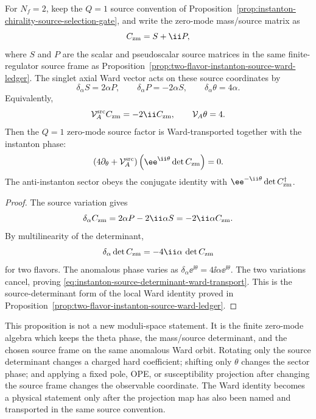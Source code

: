 \begin{proposition}
\label{prop:instanton-axial-ward-source-transport}
For \(N_f=2\), keep the \(Q=1\) source convention of
Proposition~\ref{prop:instanton-chirality-source-selection-gate}, and write the
zero-mode mass/source matrix as
\[
  C_{\rm zm}=S+\ii P ,
\]
where \(S\) and \(P\) are the scalar and pseudoscalar source matrices in the
same finite-regulator source frame as
Proposition~\ref{prop:two-flavor-instanton-source-ward-ledger}.  The singlet
axial Ward vector acts on these source coordinates by
\[
  \delta_\alpha S=2\alpha P,\qquad
  \delta_\alpha P=-2\alpha S,\qquad
  \delta_\alpha\theta=4\alpha .
\]
Equivalently,
\[
  \mathcal V_A^{\rm src}C_{\rm zm}=-2\ii C_{\rm zm},
  \qquad
  \mathcal V_A\theta=4 .
\]
Then the \(Q=1\) zero-mode source factor is Ward-transported together with the
instanton phase:
\begin{equation}
  \left(4\partial_\theta+\mathcal V_A^{\rm src}\right)
  \left(\ee^{\ii\theta}\det C_{\rm zm}\right)=0 .
  \label{eq:instanton-source-determinant-ward-transport}
\end{equation}
The anti-instanton sector obeys the conjugate identity with
\(\ee^{-\ii\theta}\det C_{\rm zm}^{\dagger}\).
\end{proposition}

\begin{proof}
The source variation gives
\[
  \delta_\alpha C_{\rm zm}
  =
  2\alpha P-2\ii\alpha S
  =
  -2\ii\alpha C_{\rm zm}.
\]
By multilinearity of the determinant,
\[
  \delta_\alpha\det C_{\rm zm}
  =
  -4\ii\alpha\,\det C_{\rm zm}
\]
for two flavors.  The anomalous phase varies as
\(\delta_\alpha\ee^{\ii\theta}=4\ii\alpha\ee^{\ii\theta}\).  The two
variations cancel, proving
\eqref{eq:instanton-source-determinant-ward-transport}.  This is the
source-determinant form of the local Ward identity proved in
Proposition~\ref{prop:two-flavor-instanton-source-ward-ledger}.
\end{proof}

This proposition is not a new moduli-space statement.  It is the finite
zero-mode algebra which keeps the theta phase, the mass/source determinant,
and the chosen source frame on the same anomalous Ward orbit.  Rotating only
the source determinant changes a charged hard coefficient; shifting only
\(\theta\) changes the sector phase; and applying a fixed pole, OPE, or
susceptibility projection after changing the source frame changes the
observable coordinate.  The Ward identity becomes a physical statement only
after the projection map has also been named and transported in the same
source convention.

